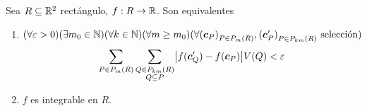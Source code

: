 \begin{lema}\label{lem:Cauchy}
Sea $ R \subseteq \mathbb{R}^2 $ rect\'angulo, $ f:R \to \mathbb{R} $. Son equivalentes
\begin{enumerate}
    \item $ ( \forall \varepsilon > 0 )
        ( \exists m_0\in \mathbb{N})
        ( \forall k\in \mathbb{N})
        ( \forall m \geq m_0 )
        ( \forall {(\boldsymbol{c}_P)}_{P \in P_{m}(R)}, {(\boldsymbol{c}'_P)}_{P \in
        P_{km}(R)} \allowbreak \text{ selecci\'on} ) $
        \[ \sum_{P \in P_{m}(R)}
            \sum_{\substack{Q \in P_{km}(R) \\ Q \subseteq P}}
            \bigr\lvert f(\boldsymbol{c}'_Q)-f(\boldsymbol{c}_P) \bigl\rvert V(Q)
            < \varepsilon \]
    \item $ f $ es integrable en $ R $.
\end{enumerate}
\end{lema}

